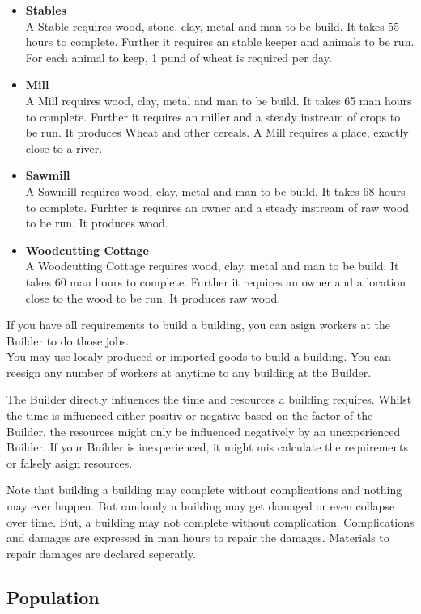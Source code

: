 \begin{itemize}
\item \textbf{Stables} \\ A Stable requires wood, stone, clay, metal and man to be build. It takes 55 hours to complete. Further it requires an stable keeper and animals to be run. For each animal to keep, 1 pund of wheat is required per day.
\item \textbf{Mill} \\ A Mill requires wood, clay, metal and man to be build. It takes 65 man hours to complete. Further it requires an miller and a steady instream of crops to be run. It produces Wheat and other cereals. A Mill requires a place, exactly close to a river.
\item \textbf{Sawmill} \\ A Sawmill requires wood, clay, metal and man to be build. It takes 68 hours to complete. Furhter is requires an owner and a steady instream of raw wood to be run. It produces wood.
\item \textbf{Woodcutting Cottage} \\ A Woodcutting Cottage requires wood, clay, metal and man to be build. It takes 60 man hours to complete. Further it requires an owner and a location close to the wood to be run. It produces raw wood.
\end{itemize}

If you have all requirements to build a building, you can asign workers at the Builder to do those jobs.\\
You may use localy produced or imported goods to build a building. You can reesign any number of workers at anytime to any building at the Builder.

The Builder directly influences the time and resources a building requires. Whilst the time is influenced either positiv or negative based on the factor of the Builder, the resources might only be influenced negatively by an unexperienced Builder. If your Builder is inexperienced, it might mis calculate the requirements or falsely asign resources.

Note that building a building may complete without complications and nothing may ever happen. But randomly a building may get damaged or even collapse over time. But, a building may not complete without complication. Complications and damages are expressed in man hours to repair the damages. Materials to repair damages are declared seperatly.

\subsection{Population}

